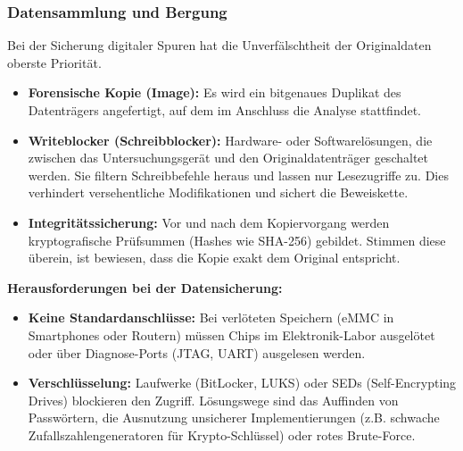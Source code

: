 \documentclass[
../../css_summary.tex,
]{subfiles}
\begin{document}
\subsubsection{Datensammlung und Bergung}
Bei der Sicherung digitaler Spuren hat die Unverfälschtheit der Originaldaten oberste Priorität.
\begin{itemize}
  \item \textbf{Forensische Kopie (Image):} Es wird ein bitgenaues Duplikat des Datenträgers angefertigt, auf dem im Anschluss die Analyse stattfindet.
  \item \textbf{Writeblocker (Schreibblocker):} Hardware- oder Softwarelösungen, die zwischen das Untersuchungsgerät und den Originaldatenträger geschaltet werden. Sie filtern Schreibbefehle heraus und lassen nur Lesezugriffe zu. Dies verhindert versehentliche Modifikationen und sichert die Beweiskette.
  \item \textbf{Integritätssicherung:} Vor und nach dem Kopiervorgang werden kryptografische Prüfsummen (Hashes wie SHA-256) gebildet. Stimmen diese überein, ist bewiesen, dass die Kopie exakt dem Original entspricht.
\end{itemize}

\textbf{Herausforderungen bei der Datensicherung:}
\begin{itemize}
  \item \textbf{Keine Standardanschlüsse:} Bei verlöteten Speichern (eMMC in Smartphones oder Routern) müssen Chips im Elektronik-Labor ausgelötet oder über Diagnose-Ports (JTAG, UART) ausgelesen werden. %
  \item \textbf{Verschlüsselung:} Laufwerke (BitLocker, LUKS) oder SEDs (Self-Encrypting Drives) blockieren den Zugriff. Lösungswege sind das Auffinden von Passwörtern, die Ausnutzung unsicherer Implementierungen (z.B. schwache Zufallszahlengeneratoren für Krypto-Schlüssel) oder rotes Brute-Force.
\end{itemize}
\end{document}

